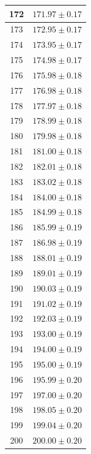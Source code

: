 \documentclass[prb,12pt]{revtex4-2}
\theoremstyle{definition}
\theoremstyle{definition}
\begin{document}
\begin{longtable}{cc}
172 & $171.97\pm 0.17$ \\\midrule
173 & $172.95\pm 0.17$ \\\midrule
174 & $173.95\pm 0.17$ \\\midrule
175 & $174.98\pm 0.17$ \\\midrule
176 & $175.98\pm 0.18$ \\\midrule
177 & $176.98\pm 0.18$ \\\midrule
178 & $177.97\pm 0.18$ \\\midrule
179 & $178.99\pm 0.18$ \\\midrule
180 & $179.98\pm 0.18$ \\\midrule
181 & $181.00\pm 0.18$ \\\midrule
182 & $182.01\pm 0.18$ \\\midrule
183 & $183.02\pm 0.18$ \\\midrule
184 & $184.00\pm 0.18$ \\\midrule
185 & $184.99\pm 0.18$ \\\midrule
186 & $185.99\pm 0.19$ \\\midrule
187 & $186.98\pm 0.19$ \\\midrule
188 & $188.01\pm 0.19$ \\\midrule
189 & $189.01\pm 0.19$ \\\midrule
190 & $190.03\pm 0.19$ \\\midrule
191 & $191.02\pm 0.19$ \\\midrule
192 & $192.03\pm 0.19$ \\\midrule
193 & $193.00\pm 0.19$ \\\midrule
194 & $194.00\pm 0.19$ \\\midrule
195 & $195.00\pm 0.19$ \\\midrule
196 & $195.99\pm 0.20$ \\\midrule
197 & $197.00\pm 0.20$ \\\midrule
198 & $198.05\pm 0.20$ \\\midrule
199 & $199.04\pm 0.20$ \\\midrule
200 & $200.00\pm 0.20$ \\\bottomrule
\end{longtable}
\end{document}
